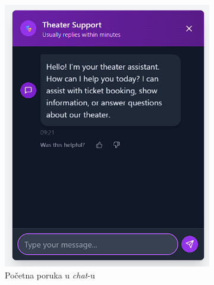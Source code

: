 \begin{itemize}
\begin{figure}[H]
    \centering
    \begin{subfigure}[b]{0.45\textwidth}
        \centering
        \includegraphics[width=\linewidth]{Slike/FZ6/chatbeginning.png}
        \caption{Početna poruka u \textit{chat}-u}
        \label{fig:chatbeginning}
    \end{subfigure}
    \hfill
    \begin{subfigure}[b]{0.45\textwidth}
        \centering

\end{subfigure}
\end{figure}
\end{itemize}
